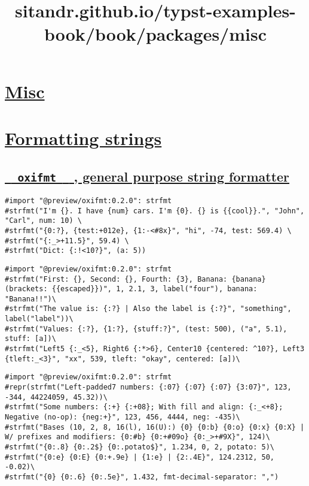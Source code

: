 \title{sitandr.github.io/typst-examples-book/book/packages/misc}

\section{\texorpdfstring{\hyperref[misc]{Misc}}{Misc}}\label{misc}

\section{\texorpdfstring{\hyperref[formatting-strings]{Formatting
strings}}{Formatting strings}}\label{formatting-strings}

\subsection{\texorpdfstring{\hyperref[oxifmt-general-purpose-string-formatter]{\texttt{\ }{\texttt{\ oxifmt\ }}\texttt{\ }
, general purpose string
formatter}}{  oxifmt   , general purpose string formatter}}\label{oxifmt-general-purpose-string-formatter}

\begin{verbatim}
#import "@preview/oxifmt:0.2.0": strfmt
#strfmt("I'm {}. I have {num} cars. I'm {0}. {} is {{cool}}.", "John", "Carl", num: 10) \
#strfmt("{0:?}, {test:+012e}, {1:-<#8x}", "hi", -74, test: 569.4) \
#strfmt("{:_>+11.5}", 59.4) \
#strfmt("Dict: {:!<10?}", (a: 5))
\end{verbatim}

\pandocbounded{}

\begin{verbatim}
#import "@preview/oxifmt:0.2.0": strfmt
#strfmt("First: {}, Second: {}, Fourth: {3}, Banana: {banana} (brackets: {{escaped}})", 1, 2.1, 3, label("four"), banana: "Banana!!")\
#strfmt("The value is: {:?} | Also the label is {:?}", "something", label("label"))\
#strfmt("Values: {:?}, {1:?}, {stuff:?}", (test: 500), ("a", 5.1), stuff: [a])\
#strfmt("Left5 {:_<5}, Right6 {:*>6}, Center10 {centered: ^10?}, Left3 {tleft:_<3}", "xx", 539, tleft: "okay", centered: [a])\
\end{verbatim}

\pandocbounded{}

\begin{verbatim}
#import "@preview/oxifmt:0.2.0": strfmt
#repr(strfmt("Left-padded7 numbers: {:07} {:07} {:07} {3:07}", 123, -344, 44224059, 45.32))\
#strfmt("Some numbers: {:+} {:+08}; With fill and align: {:_<+8}; Negative (no-op): {neg:+}", 123, 456, 4444, neg: -435)\
#strfmt("Bases (10, 2, 8, 16(l), 16(U):) {0} {0:b} {0:o} {0:x} {0:X} | W/ prefixes and modifiers: {0:#b} {0:+#09o} {0:_>+#9X}", 124)\
#strfmt("{0:.8} {0:.2$} {0:.potato$}", 1.234, 0, 2, potato: 5)\
#strfmt("{0:e} {0:E} {0:+.9e} | {1:e} | {2:.4E}", 124.2312, 50, -0.02)\
#strfmt("{0} {0:.6} {0:.5e}", 1.432, fmt-decimal-separator: ",")
\end{verbatim}


